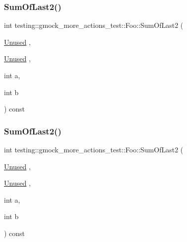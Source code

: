 \subsubsection{\texorpdfstring{SumOfLast2()}{SumOfLast2()}\hspace{0.1cm}{\footnotesize\ttfamily [1/3]}}
{\footnotesize\ttfamily int testing\+::gmock\+\_\+more\+\_\+actions\+\_\+test\+::\+Foo\+::\+Sum\+Of\+Last2 (\begin{DoxyParamCaption}\item[{\mbox{\hyperlink{namespacetesting_a603e329ec0263ebfcf16f712810bd511}{Unused}}}]{,  }\item[{\mbox{\hyperlink{namespacetesting_a603e329ec0263ebfcf16f712810bd511}{Unused}}}]{,  }\item[{int}]{a,  }\item[{int}]{b }\end{DoxyParamCaption}) const\hspace{0.3cm}{\ttfamily [inline]}}

\mbox{\label{classtesting_1_1gmock__more__actions__test_1_1_foo_abc041eb7a8e8211656495f2540f315ec}} 
\subsubsection{\texorpdfstring{SumOfLast2()}{SumOfLast2()}\hspace{0.1cm}{\footnotesize\ttfamily [2/3]}}
{\footnotesize\ttfamily int testing\+::gmock\+\_\+more\+\_\+actions\+\_\+test\+::\+Foo\+::\+Sum\+Of\+Last2 (\begin{DoxyParamCaption}\item[{\mbox{\hyperlink{namespacetesting_a603e329ec0263ebfcf16f712810bd511}{Unused}}}]{,  }\item[{\mbox{\hyperlink{namespacetesting_a603e329ec0263ebfcf16f712810bd511}{Unused}}}]{,  }\item[{int}]{a,  }\item[{int}]{b }\end{DoxyParamCaption}) const\hspace{0.3cm}{\ttfamily [inline]}}

\mbox{\label{classtesting_1_1gmock__more__actions__test_1_1_foo_abc041eb7a8e8211656495f2540f315ec}} 

